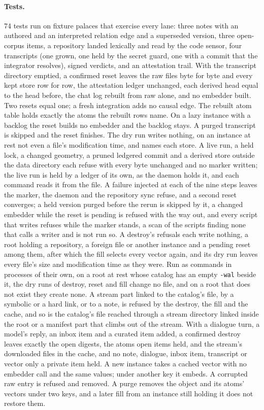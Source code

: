 \documentclass[11pt]{article}
\theoremstyle{plain}
\theoremstyle{definition}
\theoremstyle{remark}
\newcommand{\code}[1]{\texttt{#1}}
\newcommand{\ntests}{74}
\begin{document}
\paragraph{Tests.} \ntests{} tests run on fixture palaces that exercise every lane: three notes with
an authored and an interpreted relation edge and a superseded version, three open-corpus items, a
repository landed lexically and read by the code sensor, four transcripts (one grown, one held by
the secret guard, one with a commit that the integrator resolves), signed verdicts, and an
attestation trail. With the transcript directory emptied, a confirmed reset leaves the raw files
byte for byte and every kept store row for row, the attestation ledger unchanged, each derived head
equal to the head before, the chat log rebuilt from raw alone, and no embedder built. Two resets
equal one; a fresh integration adds no causal edge. The rebuilt atom table holds exactly the atoms
the rebuilt rows name. On a lazy instance with a backlog the reset builds no embedder and the
backlog stays. A purged transcript is skipped and the reset finishes. The dry run writes nothing,
on an instance at rest not even a file's modification time, and names each store. A live run, a
held lock, a changed geometry, a pruned ledgered commit and a derived store outside the data
directory each refuse with every byte unchanged and no marker written; the live run is held by a
ledger of its own, as the daemon holds it, and each command reads it from the file. A failure injected at each
of the nine steps leaves the marker, the daemon and the repository sync refuse, and a second reset
converges; a held version purged before the rerun is skipped by it, a changed embedder while the
reset is pending is refused with the way out, and every script that writes refuses while the
marker stands, a scan of the scripts finding none that calls a writer and is not run so. A
destroy's refusals each write nothing, a root holding a repository, a foreign file or another
instance and a pending reset among them, after which the fill selects every vector again, and its
dry run leaves every file's size and modification time as they were. Run as commands in processes of their own, on a root at rest whose catalog has an empty
\code{-wal} beside it, the dry runs of destroy, reset and fill change no file, and on a root that
does not exist they create none. A stream part linked to the catalog's file, by a symbolic or a
hard link, or to a note, is refused by the destroy, the fill and the cache, and so is the
catalog's file reached through a stream directory linked inside the root or a manifest part that
climbs out of the stream. With a dialogue turn, a
model's reply, an inbox item and a curated item added, a confirmed destroy leaves exactly the open
digests, the atoms open items held, and the stream's downloaded files in the cache, and no note,
dialogue, inbox item, transcript or vector only a private item held. A new instance takes a cached vector with no embedder
call and the same values; under another key it embeds. A corrupted raw entry is refused and
removed. A purge removes the object and its atoms' vectors under two keys, and a later fill from an
instance still holding it does not restore them.
\end{document}
